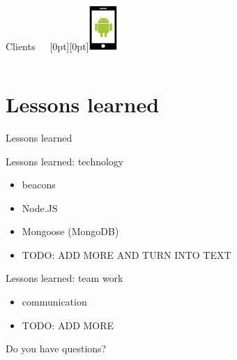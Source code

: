 \documentclass[11pt]{beamer}
\begin{document}
\begin{frame}{Clients~~~\raisebox{-10pt}[0pt][0pt]{\includegraphics[width=0.08\textwidth]{tech-stack-android}}}
\begin{columns}[T]
\begin{column}{.4\textwidth}
	\end{column}
\end{columns}
\end{frame}


\section{Lessons learned}

\begin{frame}{}

  \begin{center}

    {\Huge Lessons learned}

  \end{center}

\end{frame}


\begin{frame}{Lessons learned: technology}

  \begin{itemize}
    \item beacons
    \item Node.JS
    \item Mongoose (MongoDB)
    \item TODO: ADD MORE AND TURN INTO TEXT
  \end{itemize}

\end{frame}


\begin{frame}{Lessons learned: team work}

  \begin{itemize}
    \item communication
    \item TODO: ADD MORE
  \end{itemize}

\end{frame}


\begin{frame}{}

	\begin{center}

		{\Huge Do you have questions?}

    \end{center}

\end{frame}
\end{document}
